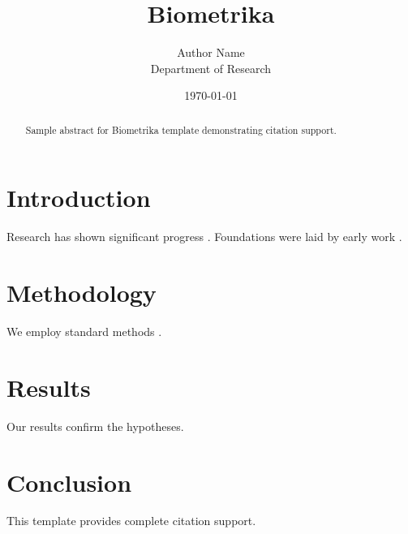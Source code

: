 \documentclass{wiley-nj}
\title{Biometrika}
\author{Author Name \\ \small Department of Research}
\date{\today}
\begin{document}
\maketitle

\begin{abstract}
Sample abstract for Biometrika template demonstrating citation support.
\end{abstract}

\section{Introduction}
Research has shown significant progress \citep{einstein1905}. Foundations were laid by early work \citep{turing1950}.

\section{Methodology}
We employ standard methods \citep{knuth1984}.

\section{Results}
Our results confirm the hypotheses.

\section{Conclusion}
This template provides complete citation support.



\end{document}
